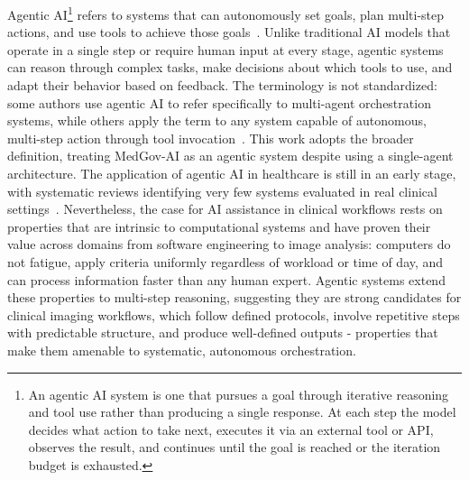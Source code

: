 \documentclass[conference]{IEEEtran}
\begin{document}
Agentic AI\footnote{An agentic AI system is one that pursues a goal through iterative reasoning and tool use rather than producing a single response. At each step the model decides what action to take next, executes it via an external tool or API, observes the result, and continues until the goal is reached or the iteration budget is exhausted.} refers to systems that can autonomously set goals, plan multi-step actions, and use tools to achieve those goals~\cite{collaco2026scoping}. Unlike traditional AI models that operate in a single step or require human input at every stage, agentic systems can reason through complex tasks, make decisions about which tools to use, and adapt their behavior based on feedback. The terminology is not standardized: some authors use agentic AI to refer specifically to multi-agent orchestration systems, while others apply the term to any system capable of autonomous, multi-step action through tool invocation~\cite{abouali2026survey}. This work adopts the broader definition, treating MedGov-AI as an agentic system despite using a single-agent architecture. The application of agentic AI in healthcare is still in an early stage, with systematic reviews identifying very few systems evaluated in real clinical settings~\cite{collaco2026scoping, dietrich2025agentic, chen2025autonomous}. Nevertheless, the case for AI assistance in clinical workflows rests on properties that are intrinsic to computational systems and have proven their value across domains from software engineering to image analysis: computers do not fatigue, apply criteria uniformly regardless of workload or time of day, and can process information faster than any human expert. Agentic systems extend these properties to multi-step reasoning, suggesting they are strong candidates for clinical imaging workflows, which follow defined protocols, involve repetitive steps with predictable structure, and produce well-defined outputs - properties that make them amenable to systematic, autonomous orchestration.
\end{document}
